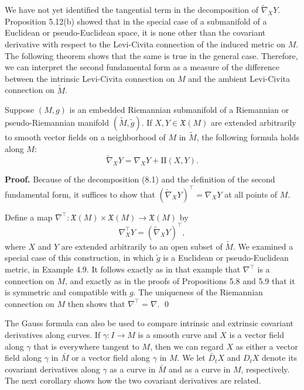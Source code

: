 We have not yet identified the tangential term in the decomposition of $\tilde{\nabla}_X Y$. Proposition 5.12(b) showed that in the special case of a submanifold of a Euclidean or pseudo-Euclidean space, it is none other than the covariant derivative with respect to the Levi-Civita connection of the induced metric on $M$. The following theorem shows that the same is true in the general case. Therefore, we can interpret the second fundamental form as a measure of the difference between the intrinsic Levi-Civita connection on $M$ and the ambient Levi-Civita connection on $\tilde{M}$.

\begin{theorem}
\label{thm:gauss-formula}

Suppose $(M,g)$ is an embedded Riemannian submanifold of a Riemannian or pseudo-Riemannian manifold $(\tilde{M},\tilde{g})$. If $X,Y \in \mathfrak{X}(M)$ are extended arbitrarily to smooth vector fields on a neighborhood of $M$ in $\tilde{M}$, the following formula holds along $M$:
\[
\tilde{\nabla}_X Y = \nabla_X Y + \text{II}(X,Y).
\]
\end{theorem}

\textbf{Proof.} Because of the decomposition (8.1) and the definition of the second fundamental form, it suffices to show that $(\tilde{\nabla}_X Y)^\top = \nabla_X Y$ at all points of $M$.

Define a map $\nabla^\top: \mathfrak{X}(M) \times \mathfrak{X}(M) \to \mathfrak{X}(M)$ by
\[
\nabla^\top_X Y = (\tilde{\nabla}_X Y)^\top,
\]
where $X$ and $Y$ are extended arbitrarily to an open subset of $\tilde{M}$. We examined a special case of this construction, in which $\tilde{g}$ is a Euclidean or pseudo-Euclidean metric, in Example 4.9. It follows exactly as in that example that $\nabla^\top$ is a connection on $M$, and exactly as in the proofs of Propositions 5.8 and 5.9 that it is symmetric and compatible with $g$. The uniqueness of the Riemannian connection on $M$ then shows that $\nabla^\top = \nabla$. \qed

The Gauss formula can also be used to compare intrinsic and extrinsic covariant derivatives along curves. If $\gamma : I \to M$ is a smooth curve and $X$ is a vector field along $\gamma$ that is everywhere tangent to $M$, then we can regard $X$ as either a vector field along $\gamma$ in $\bar{M}$ or a vector field along $\gamma$ in $M$. We let $\bar{D}_t X$ and $D_t X$ denote its covariant derivatives along $\gamma$ as a curve in $\bar{M}$ and as a curve in $M$, respectively. The next corollary shows how the two covariant derivatives are related.

